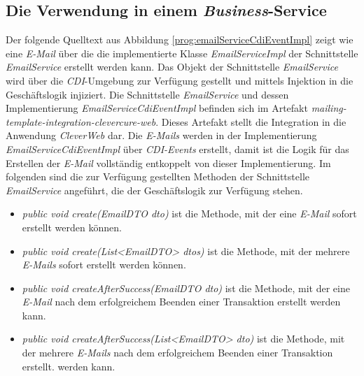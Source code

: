 \subsection{Die Verwendung in einem \emph{Business}-Service}
Der folgende Quelltext aus Abbildung \ref{prog:emailServiceCdiEventImpl} zeigt wie eine \emph{E-Mail} über die die implementierte Klasse \emph{EmailServiceImpl} der Schnittstelle \emph{EmailService} erstellt werden kann. Das Objekt der Schnittstelle \emph{EmailService} wird über die \emph{CDI}-Umgebung zur Verfügung gestellt und mittels Injektion in die Geschäftslogik injiziert. Die Schnittstelle \emph{EmailService} und dessen Implementierung \emph{EmailServiceCdiEventImpl} befinden sich im Artefakt \emph{mailing-template-integration-clevercure-web}. Dieses Artefakt stellt die Integration in die Anwendung \emph{CleverWeb}  dar. Die \emph{E-Mails} werden in der Implementierung \emph{EmailServiceCdiEventImpl} über \emph{CDI-Events} erstellt, damit ist die Logik für das Erstellen der \emph{E-Mail} vollständig entkoppelt von dieser Implementierung. Im folgenden sind die zur Verfügung gestellten Methoden der Schnittstelle \emph{EmailService} angeführt, die der Geschäftslogik zur Verfügung stehen.
\begin{itemize}
	\item\emph{public void create(EmailDTO dto)}
	\newline
	ist die Methode, mit der eine \emph{E-Mail} sofort erstellt werden können.
	\item\emph{public void create(List<EmailDTO> dtos)}
	\newline
	ist die Methode, mit der mehrere \emph{E-Mails} sofort erstellt werden können.
	\item\emph{public void createAfterSuccess(EmailDTO dto)}
	\newline
	ist die Methode, mit der eine \emph{E-Mail} nach dem erfolgreichem Beenden einer Transaktion erstellt werden kann.
	\item\emph{public void createAfterSuccess(List<EmailDTO> dto)}
	\newline
	ist die Methode, mit der mehrere \emph{E-Mails} nach dem erfolgreichem Beenden einer Transaktion erstellt.
 werden kann.    
\end{itemize} 
